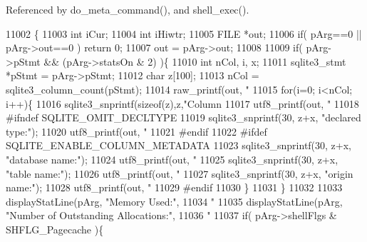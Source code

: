 Referenced by do\+\_\+meta\+\_\+command(), and shell\+\_\+exec().


\begin{DoxyCode}
11002  \{
11003   \textcolor{keywordtype}{int} iCur;
11004   \textcolor{keywordtype}{int} iHiwtr;
11005   FILE *out;
11006   \textcolor{keywordflow}{if}( pArg==0 || pArg->out==0 ) \textcolor{keywordflow}{return} 0;
11007   out = pArg->out;
11008 
11009   \textcolor{keywordflow}{if}( pArg->pStmt && (pArg->statsOn & 2) )\{
11010     \textcolor{keywordtype}{int} nCol, i, x;
11011     sqlite3_stmt *pStmt = pArg->pStmt;
11012     \textcolor{keywordtype}{char} z[100];
11013     nCol = sqlite3_column_count(pStmt);
11014     raw_printf(out, \textcolor{stringliteral}{"%
11015     \textcolor{keywordflow}{for}(i=0; i<nCol; i++)\{
11016       sqlite3_snprintf(\textcolor{keyword}{sizeof}(z),z,\textcolor{stringliteral}{"Column %
11017       utf8_printf(out, \textcolor{stringliteral}{"%
11018 \textcolor{preprocessor}{#ifndef SQLITE\_OMIT\_DECLTYPE}
11019       sqlite3_snprintf(30, z+x, \textcolor{stringliteral}{"declared type:"});
11020       utf8_printf(out, \textcolor{stringliteral}{"%
11021 \textcolor{preprocessor}{#endif}
11022 \textcolor{preprocessor}{#ifdef SQLITE\_ENABLE\_COLUMN\_METADATA}
11023       sqlite3_snprintf(30, z+x, \textcolor{stringliteral}{"database name:"});
11024       utf8_printf(out, \textcolor{stringliteral}{"%
11025       sqlite3_snprintf(30, z+x, \textcolor{stringliteral}{"table name:"});
11026       utf8_printf(out, \textcolor{stringliteral}{"%
11027       sqlite3_snprintf(30, z+x, \textcolor{stringliteral}{"origin name:"});
11028       utf8_printf(out, \textcolor{stringliteral}{"%
11029 \textcolor{preprocessor}{#endif}
11030     \}
11031   \}
11032 
11033   displayStatLine(pArg, \textcolor{stringliteral}{"Memory Used:"},
11034      \textcolor{stringliteral}{"%
11035   displayStatLine(pArg, \textcolor{stringliteral}{"Number of Outstanding Allocations:"},
11036      \textcolor{stringliteral}{"%
11037   \textcolor{keywordflow}{if}( pArg->shellFlgs & SHFLG_Pagecache )\{
}}}}}}}}}
\end{DoxyCode}

